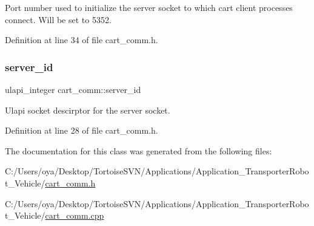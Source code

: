 Port number used to initialize the server socket to which cart client processes connect. Will be set to 5352. 

Definition at line 34 of file cart\+\_\+comm.\+h.

\mbox{\label{classcart__comm_a462fbce6dc2408c12ce9de2f4d960f6f}} 
\subsubsection{\texorpdfstring{server\+\_\+id}{server\_id}}
{\footnotesize\ttfamily ulapi\+\_\+integer cart\+\_\+comm\+::server\+\_\+id\hspace{0.3cm}{\ttfamily [private]}}

Ulapi socket descirptor for the server socket. 

Definition at line 28 of file cart\+\_\+comm.\+h.



The documentation for this class was generated from the following files\+:\begin{DoxyCompactItemize}
\item 
C\+:/\+Users/oya/\+Desktop/\+Tortoise\+S\+V\+N/\+Applications/\+Application\+\_\+\+Transporter\+Robot\+\_\+\+Vehicle/\mbox{\hyperlink{cart__comm_8h}{cart\+\_\+comm.\+h}}\item 
C\+:/\+Users/oya/\+Desktop/\+Tortoise\+S\+V\+N/\+Applications/\+Application\+\_\+\+Transporter\+Robot\+\_\+\+Vehicle/\mbox{\hyperlink{cart__comm_8cpp}{cart\+\_\+comm.\+cpp}}\end{DoxyCompactItemize}
